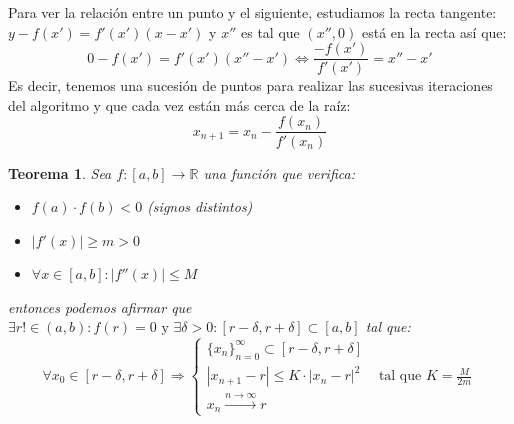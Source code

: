 \documentclass[10pt,a4paper,openright]{book}
\theoremstyle{break}
\newtheorem*{theo}{Teorema}
\begin{document}
Para ver la relación entre un punto y el siguiente, estudiamos la recta tangente: $y-f(x')=f'(x')(x-x')$ y $x''$ es tal que $(x'', 0)$ está en la recta así que:
$$0-f(x')=f'(x')(x''-x')\Leftrightarrow \frac{-f(x')}{f'(x')}=x''-x'$$
Es decir, tenemos una sucesión de puntos para realizar las sucesivas iteraciones del algoritmo y que cada vez están más cerca de la raíz:
$$x_{n+1}=x_n-\frac{f(x_n)}{f'(x_n)}$$

\begin{theo}
Sea $f: [a,b]\rightarrow \mathbb R$ una función que verifica:
\begin{itemize}
\item $f(a)\cdot f(b)<0$ (signos distintos)
\item $|f'(x)|\geq m>0$
\item $\forall x\in [a,b]: |f''(x)|\leq M$
\end{itemize}
entonces podemos afirmar que $\exists r!\in (a,b):f(r)=0\mbox{ y } \exists \delta > 0 : [r-\delta, r+\delta]\subset [a,b]$ tal que:
$$\forall x_0\in [r-\delta, r+\delta]\Rightarrow \begin{cases}\{x_n\}_{n=0}^\infty \subset [r-\delta, r+\delta] \\ |x_{n+1}-r|\leq K\cdot |x_n-r|^2 &\mbox{ tal que } K=\frac{M}{2m} \\ x_n\xrightarrow{n\rightarrow \infty}r \end{cases}$$
\end{theo}
\end{document}
